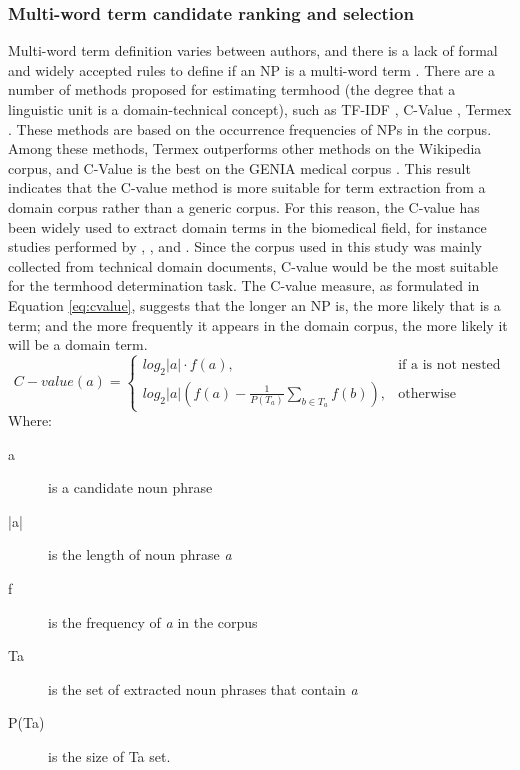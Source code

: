 \documentclass[Journal, BackFigs,NoLists, DoubleSpace]{ascelike}%
\begin{document}
\subsubsection{Multi-word term candidate ranking and selection} 
%
Multi-word term definition varies between authors, and there is a lack of formal and widely accepted rules to define if an NP is a multi-word term \cite{frantzi20}. There are a number of methods proposed for estimating termhood (the degree that a linguistic unit is a domain-technical concept), such as TF-IDF \cite{sparck72,salton88}, C-Value \cite{frantzi20}, Termex  \cite{sclano07}. These methods are based on the occurrence frequencies of NPs in the corpus. Among these methods, Termex outperforms other methods on the Wikipedia corpus, and C-Value is the best on the GENIA medical corpus \cite{zhang08}. This result indicates that the C-value method is more suitable for term extraction from a domain corpus rather than a generic corpus. For this reason, the C-value has been widely used to extract domain terms in the biomedical field, for instance studies performed by , , and . Since the corpus used in this study was mainly collected from technical domain documents, C-value would be the most suitable for the termhood determination task. The C-value measure, as formulated in Equation \ref{eq:cvalue}, suggests that the longer an NP is, the more likely that is a term; and the more frequently it appears in the domain corpus, the more likely it will be a domain term.
	\begin{equation}
	C-value(a)=
	\begin{cases}
	log_2|a| \cdot f(a), & \text{if a is not nested} \\
	log_2|a|(f(a)-\frac{1}{P(T_a)}\sum_{b\in T_a} f(b)), & \text{otherwise}
	\end{cases}
	\label{eq:cvalue}
	\end{equation}
	Where:
	\begin{description}
		\item[a] is a candidate noun phrase
		\item[|a|] is the length of noun phrase \textit{a}
		\item[f] is the frequency of \textit{a} in the corpus
		\item[Ta] is the set of extracted noun phrases that contain \textit{a}
		\item[P(Ta)] is the size of Ta set.
	\end{description}
\end{document}
